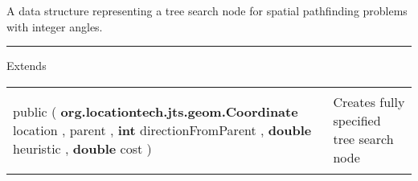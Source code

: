  {\scriptsize A data structure representing a tree search node for \newline%
 spatial pathfinding problems with integer angles.
 
\vspace*{4pt} \hrule \vspace*{3pt}
Extends \textbf{ \hyperref[tab:SearchNode]{\color{blue}{SearchNode}} }
\vspace*{-5pt} 
\begin{tabularx}{\linewidth}{m{}|m{}}
\label{tab:DirectedSearchNode}
\begin{raggedleft}public  \textbf{\hyperref[tab:DirectedSearchNode]{\color{blue}{DirectedSearchNode}} }(\newline \hfill 
\hspace*{ 5pt} \textbf{org.locationtech.jts.geom.Coordinate} location , \newline
 \hspace*{ 5pt} \textbf{\hyperref[tab:DirectedSearchNode]{\color{blue}{DirectedSearchNode}}} parent , \newline
 \hspace*{ 5pt} \textbf{int} directionFromParent , \newline
 \hspace*{ 5pt} \textbf{double} heuristic , \newline
 \hspace*{ 5pt} \textbf{double} cost  )
\end{raggedleft} &
 Creates fully specified tree search node\\\end{tabularx}
}
